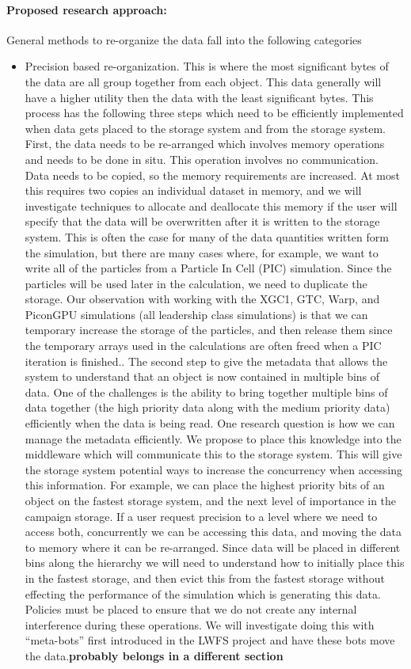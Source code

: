\paragraph{Proposed research approach:}
General methods to re-organize the data fall into the following categories
\begin{itemize}
\item Precision based re-organization. This is where the most significant bytes of the data are
all group together from each object. This data generally will have a higher utility then the data with
the least significant bytes.  This process has the following three steps which need to be
efficiently implemented when data gets placed to the storage system and from the storage 
system. 
%
First, the data needs to be re-arranged which involves memory operations and needs
to be done in situ. This operation involves no communication.  Data needs to be copied, so
the memory requirements are increased. At most this requires two copies an individual dataset
in memory, and we will investigate techniques to allocate and deallocate this memory if the user
will specify that the data will be overwritten after it is written to the storage system. This is often
the case for many of the data quantities written form the simulation, but there are many cases
where, for example, we want to write all of the particles from a Particle In Cell (PIC) simulation. 
Since the particles will be used later in the calculation, we need to duplicate the storage. Our
observation with working with the XGC1, GTC, Warp, and PiconGPU simulations (all leadership
class simulations) is that we can temporary increase the storage of the particles, and then 
release them since the temporary arrays used in the calculations are often freed when a PIC
iteration is finished.. 
%
The second step to give the metadata that allows the system to understand that an object is now contained in multiple bins of data. One of the challenges is the ability to bring together multiple bins
of data together (the high priority data along with the medium priority data) efficiently when the 
data is being read.  One research question is how we can manage the metadata efficiently.
We propose to place this knowledge into the middleware which will communicate this to the 
storage system.  This will give the storage system potential ways to increase the concurrency 
when accessing this information. For example, we can place the highest priority bits of an object
on the fastest storage system, and the next level of importance in the campaign storage. If a 
user request precision to a level where we need to access both, concurrently we can be
accessing this data, and moving the data to memory where it can be re-arranged. 
%
Since data will be placed in different bins along the hierarchy we will need to understand how
to initially place this in the fastest storage, and then evict this from the fastest storage without
effecting the performance of the simulation which is generating this data. Policies must be 
placed to ensure that we do not create any internal interference during these operations. We
will investigate doing this with ``meta-bots'' first introduced in the LWFS project and have 
these bots move the data.{\bf probably belongs in a different section} 


\end{itemize}
